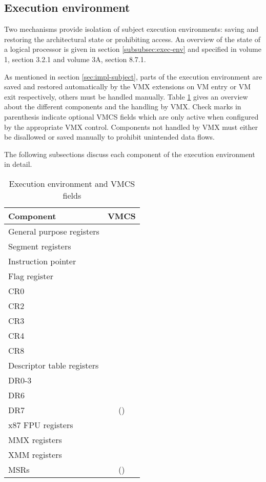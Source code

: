 \subsection{Execution environment}
Two mechanisms provide isolation of subject execution environments: saving and
restoring the architectural state or prohibiting access. An overview of the
state of a logical processor is given in section \ref{subsubsec:exec-env} and
specified in \cite{IntelSDM} volume 1, section 3.2.1 and volume 3A,
section 8.7.1.

As mentioned in section \ref{sec:impl-subject}, parts of the execution
environment are saved and restored automatically by the VMX extensions on VM
entry or VM exit respectively, others must be handled manually. Table
\ref{tab:exec-env-storage} gives an overview about the different components and
the handling by VMX. Check marks in parenthesis indicate optional VMCS fields
which are only active when configured by the appropriate VMX control.
Components not handled by VMX must either be disallowed or saved manually to
prohibit unintended data flows.

The following subsections discuss each component of the execution environment in
detail.

\begin{table}[h]
	\centering
	\begin{tabular}{l|c}
		\textbf{Component} & \textbf{VMCS} \\
		\hline
		General purpose registers  & \\
		Segment registers          & \checkmark \\
		Instruction pointer        & \checkmark \\
		Flag register              & \checkmark \\
		CR0                        & \checkmark \\
		CR2                        & \\
		CR3                        & \checkmark \\
		CR4                        & \checkmark \\
		CR8                        & \\
		Descriptor table registers & \checkmark \\
		DR0-3                      & \\
		DR6                        & \\
		DR7                        & (\checkmark) \\
		x87 FPU registers          & \\
		MMX registers              & \\
		XMM registers              & \\
		MSRs                       & (\checkmark) \\
		\hline
	\end{tabular}
	\caption{Execution environment and VMCS fields}
	\label{tab:exec-env-storage}
\end{table}

